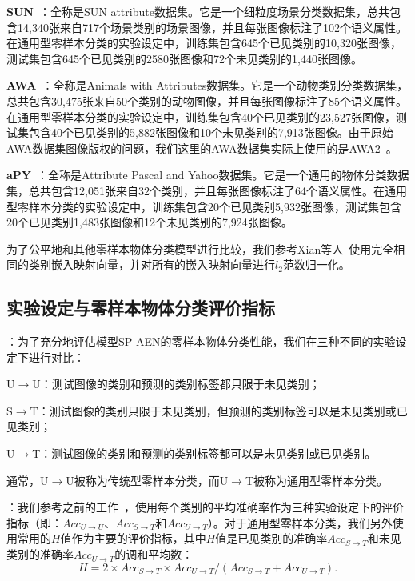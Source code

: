 \textbf{SUN}~\cite{patterson2012sun}：全称是SUN attribute数据集。它是一个细粒度场景分类数据集，总共包含14,340张来自717个场景类别的场景图像，并且每张图像标注了102个语义属性。在通用型零样本分类的实验设定中，训练集包含645个已见类别的10,320张图像，测试集包含645个已见类别的2580张图像和72个未见类别的1,440张图像。

\textbf{AWA}~\cite{lampert2009learning}：全称是Animals with Attributes数据集。它是一个动物类别分类数据集，总共包含30,475张来自50个类别的动物图像，并且每张图像标注了85个语义属性。在通用型零样本分类的实验设定中，训练集包含40个已见类别的23,527张图像，测试集包含40个已见类别的5,882张图像和10个未见类别的7,913张图像。由于原始AWA数据集图像版权的问题，我们这里的AWA数据集实际上使用的是AWA2~\cite{xian2017zero,xian2018zero}。

\textbf{aPY}~\cite{farhadi2009describing}：全称是Attribute Pascal and Yahoo数据集。它是一个通用的物体分类数据集，总共包含12,051张来自32个类别，并且每张图像标注了64个语义属性。在通用型零样本分类的实验设定中，训练集包含20个已见类别5,932张图像，测试集包含20个已见类别1,483张图像和12个未见类别的7,924张图像。

为了公平地和其他零样本物体分类模型进行比较，我们参考Xian等人~\cite{xian2017zero}使用完全相同的类别嵌入映射向量，并对所有的嵌入映射向量进行$l_2$范数归一化。


\subsection{实验设定与零样本物体分类评价指标}
\textbf{}：为了充分地评估模型SP-AEN的零样本物体分类性能，我们在三种不同的实验设定下进行对比：
\begin{asparaenum}
\item U$\to$U：测试图像的类别和预测的类别标签都只限于未见类别；

\item S$\to$T：测试图像的类别只限于未见类别，但预测的类别标签可以是未见类别或已见类别；

\item U$\to$T：测试图像的类别和预测的类别标签都可以是未见类别或已见类别。
\end{asparaenum}
通常，U$\to$U被称为传统型零样本分类，而U$\to$T被称为通用型零样本分类。

\textbf{}：我们参考之前的工作~\cite{xian2017zero}，使用每个类别的平均准确率作为三种实验设定下的评价指标（即：$Acc_{U\rightarrow U}$、$Acc_{S\rightarrow T}$和$Acc_{U\rightarrow T}$）。对于通用型零样本分类，我们另外使用常用的$H$值作为主要的评价指标，其中$H$值是已见类别的准确率$Acc_{S\rightarrow T}$和未见类别的准确率$Acc_{U\rightarrow T}$的调和平均数：
\begin{equation} \label{ch3:eq:eq_7}
H = 2\times Acc_{S\rightarrow T}\times Acc_{U\rightarrow T} /(Acc_{S\rightarrow T}+Acc_{U\rightarrow T}).
\end{equation}

